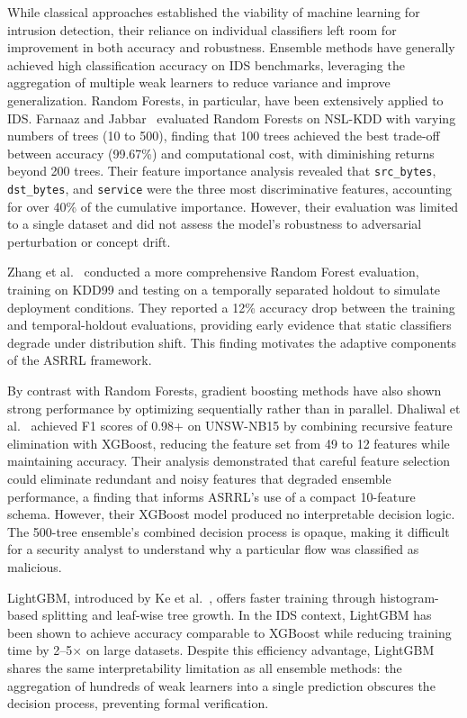 \documentclass[12pt, letterpaper, oneside]{report}
\newcommand{\ASRRL}{\textsc{ASRRL}}
\begin{document}
While classical approaches established the viability of machine learning for intrusion detection, their reliance on individual classifiers left room for improvement in both accuracy and robustness. Ensemble methods have generally achieved high classification accuracy on IDS benchmarks, leveraging the aggregation of multiple weak learners to reduce variance and improve generalization. Random Forests, in particular, have been extensively applied to IDS. Farnaaz and Jabbar~\cite{farnaaz2016} evaluated Random Forests on NSL-KDD with varying numbers of trees (10 to 500), finding that 100 trees achieved the best trade-off between accuracy (99.67\%) and computational cost, with diminishing returns beyond 200 trees. Their feature importance analysis revealed that \texttt{src\_bytes}, \texttt{dst\_bytes}, and \texttt{service} were the three most discriminative features, accounting for over 40\% of the cumulative importance. However, their evaluation was limited to a single dataset and did not assess the model's robustness to adversarial perturbation or concept drift.

Zhang et al.~\cite{zhang2008random} conducted a more comprehensive Random Forest evaluation, training on KDD99 and testing on a temporally separated holdout to simulate deployment conditions. They reported a 12\% accuracy drop between the training and temporal-holdout evaluations, providing early evidence that static classifiers degrade under distribution shift. This finding motivates the adaptive components of the \ASRRL{} framework.

By contrast with Random Forests, gradient boosting methods have also shown strong performance by optimizing sequentially rather than in parallel. Dhaliwal et al.~\cite{dhaliwal2018} achieved F1 scores of 0.98+ on UNSW-NB15 by combining recursive feature elimination with XGBoost, reducing the feature set from 49 to 12 features while maintaining accuracy. Their analysis demonstrated that careful feature selection could eliminate redundant and noisy features that degraded ensemble performance, a finding that informs \ASRRL{}'s use of a compact 10-feature schema. However, their XGBoost model produced no interpretable decision logic. The 500-tree ensemble's combined decision process is opaque, making it difficult for a security analyst to understand why a particular flow was classified as malicious.

LightGBM, introduced by Ke et al.~\cite{ke2017}, offers faster training through histogram-based splitting and leaf-wise tree growth. In the IDS context, LightGBM has been shown to achieve accuracy comparable to XGBoost while reducing training time by 2--5$\times$ on large datasets. Despite this efficiency advantage, LightGBM shares the same interpretability limitation as all ensemble methods: the aggregation of hundreds of weak learners into a single prediction obscures the decision process, preventing formal verification.
\end{document}
